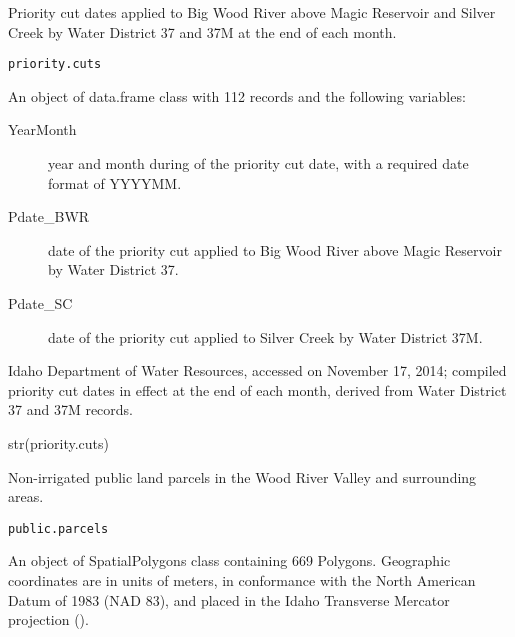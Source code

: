 \documentclass[a4paper]{book}
\begin{document}
%
\begin{Description}\relax
Priority cut dates applied to Big Wood River above Magic Reservoir and
Silver Creek by Water District 37 and 37M at the end of each month.
\end{Description}
%
\begin{Usage}
\begin{verbatim}
priority.cuts
\end{verbatim}
\end{Usage}
%
\begin{Format}
An object of data.frame class with 112 records
and the following variables:
\begin{description}

\item[YearMonth] year and month during of the priority cut date,
with a required date format of YYYYMM.
\item[Pdate\_BWR] date of the priority cut applied to
Big Wood River above Magic Reservoir by Water District 37.
\item[Pdate\_SC] date of the priority cut applied to
Silver Creek by Water District 37M.

\end{description}
\end{Format}
%
\begin{Source}\relax
Idaho Department of Water Resources, accessed on November 17, 2014;
compiled priority cut dates in effect at the end of each month,
derived from Water District 37 and 37M records.
\end{Source}
%
\begin{Examples}
\begin{ExampleCode}
str(priority.cuts)

\end{ExampleCode}
\end{Examples}
%
\begin{Description}\relax
Non-irrigated public land parcels in the Wood River Valley and surrounding areas.
\end{Description}
%
\begin{Usage}
\begin{verbatim}
public.parcels
\end{verbatim}
\end{Usage}
%
\begin{Format}
An object of SpatialPolygons class containing 669 Polygons.
Geographic coordinates are in units of meters, in conformance with the
North American Datum of 1983 (NAD 83), and placed in the
Idaho Transverse Mercator projection ().
\end{Format}
\end{document}
